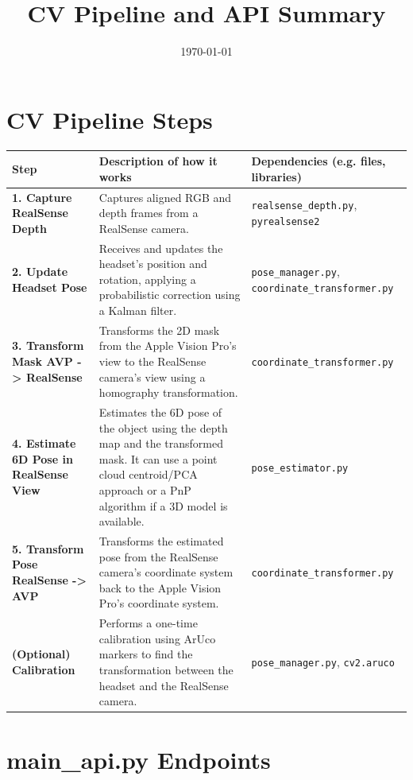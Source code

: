 \documentclass{article}
\title{CV Pipeline and API Summary}
\author{}
\date{\today}
\begin{document}
\maketitle

\section*{CV Pipeline Steps}

\begin{longtable}{| >{\raggedright\arraybackslash}p{} | >{\raggedright\arraybackslash}p{} | >{\raggedright\arraybackslash}p{} |}
\hline
\textbf{Step} & \textbf{Description of how it works} & \textbf{Dependencies (e.g. files, libraries)} \\
\hline
\endhead

\textbf{1. Capture RealSense Depth} & Captures aligned RGB and depth frames from a RealSense camera. & \texttt{realsense\_depth.py}, \texttt{pyrealsense2} \\
\hline
\textbf{2. Update Headset Pose} & Receives and updates the headset's position and rotation, applying a probabilistic correction using a Kalman filter. & \texttt{pose\_manager.py}, \texttt{coordinate\_transformer.py} \\
\hline
\textbf{3. Transform Mask AVP -> RealSense} & Transforms the 2D mask from the Apple Vision Pro's view to the RealSense camera's view using a homography transformation. & \texttt{coordinate\_transformer.py} \\
\hline
\textbf{4. Estimate 6D Pose in RealSense View} & Estimates the 6D pose of the object using the depth map and the transformed mask. It can use a point cloud centroid/PCA approach or a PnP algorithm if a 3D model is available. & \texttt{pose\_estimator.py} \\
\hline
\textbf{5. Transform Pose RealSense -> AVP} & Transforms the estimated pose from the RealSense camera's coordinate system back to the Apple Vision Pro's coordinate system. & \texttt{coordinate\_transformer.py} \\
\hline
\textbf{(Optional) Calibration} & Performs a one-time calibration using ArUco markers to find the transformation between the headset and the RealSense camera. & \texttt{pose\_manager.py}, \texttt{cv2.aruco} \\
\hline
\end{longtable}

\section*{main\_api.py Endpoints}
\end{document}

